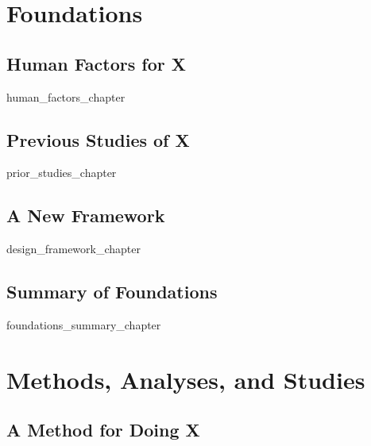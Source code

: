 \documentclass[11pt, oneside, a4paper]{book}
\begin{document}
\part{Foundations} %
\label{Part1:Foundations}




\chapter{Human Factors for X} \label{ch:HumanFactors}
{human_factors_chapter}

\chapter{Previous Studies of X} \label{ch:HighlightingStudies}
{prior_studies_chapter}

\chapter{A New Framework} \label{ch:DesignFramework}
{design_framework_chapter}

\chapter{Summary of Foundations} \label{ch:FoundationsSummary}
{foundations_summary_chapter}



\part{Methods, Analyses, and Studies} %
\label{Part2:MethodsStudies}

\chapter{A Method for Doing X} \label{ch:MethodOverview}

\end{document}
